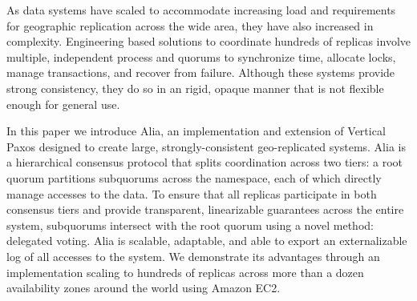 As data systems have scaled to accommodate increasing load and requirements for
geographic replication across the wide area, they have also increased in complexity.
Engineering based solutions to coordinate hundreds of replicas involve multiple,
independent process and quorums to synchronize time, allocate locks, manage transactions,
and recover from failure.
Although these systems provide strong consistency, they do so in an rigid, opaque manner
that is not flexible enough for general use.

In this paper we introduce Alia, an implementation and extension of Vertical Paxos
designed to create large, strongly-consistent geo-replicated systems.
Alia is a hierarchical consensus protocol that splits coordination across two tiers: a
root quorum partitions subquorums across the namespace, each of which directly manage
accesses to the data.
To ensure that all replicas participate in both consensus tiers and provide transparent,
linearizable guarantees across the entire system, subquorums intersect with the root
quorum using a novel method: delegated voting.
Alia is scalable, adaptable, and able to export an externalizable log of all accesses to
the system.
We demonstrate its advantages through an implementation scaling to hundreds of replicas
across more than a dozen availability zones around the world using Amazon EC2.